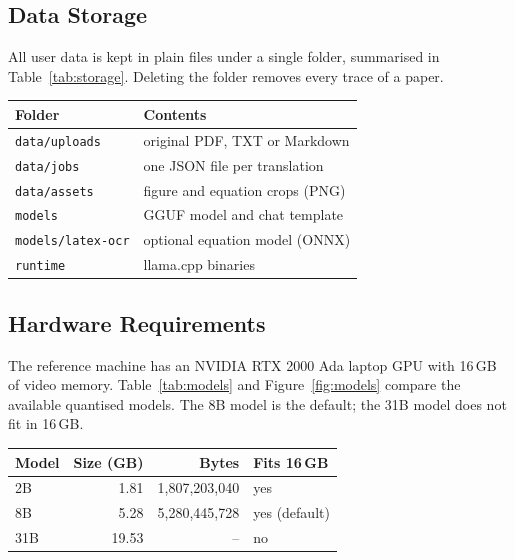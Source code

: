 \documentclass[11pt]{article}
\let\manualtable\table \let\endmanualtable\endtable
\renewenvironment{table}[1][]{\manualtable[!htbp]}{\endmanualtable}
\begin{document}
\subsection{Data Storage}
All user data is kept in plain files under a single folder, summarised in Table~\ref{tab:storage}. Deleting the folder removes every trace of a paper.

\begin{table}[t]
  \centering
  \caption{Folders used by the application.}
  \label{tab:storage}
  \begin{tabular}{@{}ll@{}}
    \toprule
    Folder & Contents \\
    \midrule
    \texttt{data/uploads} & original PDF, TXT or Markdown \\
    \texttt{data/jobs} & one JSON file per translation \\
    \texttt{data/assets} & figure and equation crops (PNG) \\
    \texttt{models} & GGUF model and chat template \\
    \texttt{models/latex-ocr} & optional equation model (ONNX) \\
    \texttt{runtime} & llama.cpp binaries \\
    \bottomrule
  \end{tabular}
\end{table}

\subsection{Hardware Requirements}
The reference machine has an NVIDIA RTX 2000 Ada laptop GPU with 16\,GB of video memory. Table~\ref{tab:models} and Figure~\ref{fig:models} compare the available quantised models. The 8B model is the default; the 31B model does not fit in 16\,GB.

\begin{table}[t]
  \centering
  \caption{PLaMo 3 Translate models in Q4\_K\_M quantisation.}
  \label{tab:models}
  \begin{tabular}{@{}lrrl@{}}
    \toprule
    Model & Size (GB) & Bytes & Fits 16\,GB \\
    \midrule
    2B & 1.81 & 1{,}807{,}203{,}040 & yes \\
    8B & 5.28 & 5{,}280{,}445{,}728 & yes (default) \\
    31B & 19.53 & -- & no \\
    \bottomrule
  \end{tabular}
\end{table}
\end{document}
